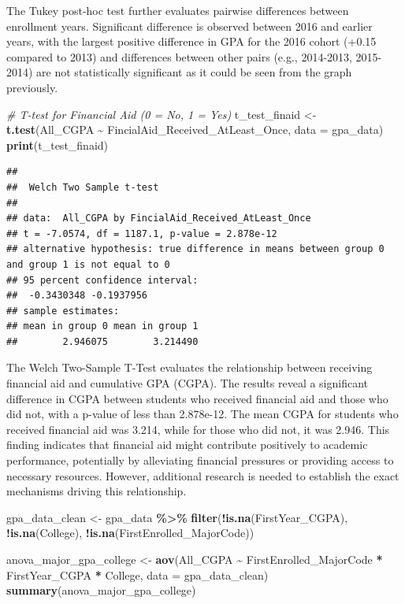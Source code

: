 \documentclass[
  12pt,
]{article}
\newenvironment{Shaded}{\begin{snugshade}}{\end{snugshade}}
\newcommand{\AttributeTok}[1]{\textcolor[rgb]{0.13,0.29,0.53}{#1}}
\newcommand{\CommentTok}[1]{\textcolor[rgb]{0.56,0.35,0.01}{\textit{#1}}}
\newcommand{\FunctionTok}[1]{\textcolor[rgb]{0.13,0.29,0.53}{\textbf{#1}}}
\newcommand{\NormalTok}[1]{#1}
\newcommand{\OtherTok}[1]{\textcolor[rgb]{0.56,0.35,0.01}{#1}}
\newcommand{\SpecialCharTok}[1]{\textcolor[rgb]{0.81,0.36,0.00}{\textbf{#1}}}
\begin{document}
The Tukey post-hoc test further evaluates pairwise differences between
enrollment years. Significant difference is observed between 2016 and
earlier years, with the largest positive difference in GPA for the 2016
cohort (+0.15 compared to 2013) and differences between other pairs
(e.g., 2014-2013, 2015-2014) are not statistically significant as it
could be seen from the graph previously.

\begin{Shaded}
\begin{Highlighting}[]
\CommentTok{\# T{-}test for Financial Aid (0 = No, 1 = Yes)}
\NormalTok{t\_test\_finaid }\OtherTok{\textless{}{-}} \FunctionTok{t.test}\NormalTok{(All\_CGPA }\SpecialCharTok{\textasciitilde{}}\NormalTok{ FincialAid\_Received\_AtLeast\_Once, }\AttributeTok{data =}\NormalTok{ gpa\_data)}
\FunctionTok{print}\NormalTok{(t\_test\_finaid)}
\end{Highlighting}
\end{Shaded}

\begin{verbatim}
## 
##  Welch Two Sample t-test
## 
## data:  All_CGPA by FincialAid_Received_AtLeast_Once
## t = -7.0574, df = 1187.1, p-value = 2.878e-12
## alternative hypothesis: true difference in means between group 0 and group 1 is not equal to 0
## 95 percent confidence interval:
##  -0.3430348 -0.1937956
## sample estimates:
## mean in group 0 mean in group 1 
##        2.946075        3.214490
\end{verbatim}

The Welch Two-Sample T-Test evaluates the relationship between receiving
financial aid and cumulative GPA (CGPA). The results reveal a
significant difference in CGPA between students who received financial
aid and those who did not, with a p-value of less than 2.878e-12. The
mean CGPA for students who received financial aid was 3.214, while for
those who did not, it was 2.946. This finding indicates that financial
aid might contribute positively to academic performance, potentially by
alleviating financial pressures or providing access to necessary
resources. However, additional research is needed to establish the exact
mechanisms driving this relationship.

\begin{Shaded}
\begin{Highlighting}[]
\NormalTok{gpa\_data\_clean }\OtherTok{\textless{}{-}}\NormalTok{ gpa\_data }\SpecialCharTok{\%\textgreater{}\%}
    \FunctionTok{filter}\NormalTok{(}\SpecialCharTok{!}\FunctionTok{is.na}\NormalTok{(FirstYear\_CGPA), }\SpecialCharTok{!}\FunctionTok{is.na}\NormalTok{(College), }\SpecialCharTok{!}\FunctionTok{is.na}\NormalTok{(FirstEnrolled\_MajorCode))}

\NormalTok{anova\_major\_gpa\_college }\OtherTok{\textless{}{-}} \FunctionTok{aov}\NormalTok{(All\_CGPA }\SpecialCharTok{\textasciitilde{}}\NormalTok{ FirstEnrolled\_MajorCode }\SpecialCharTok{*}\NormalTok{ FirstYear\_CGPA }\SpecialCharTok{*}
\NormalTok{    College, }\AttributeTok{data =}\NormalTok{ gpa\_data\_clean)}
\FunctionTok{summary}\NormalTok{(anova\_major\_gpa\_college)}
\end{Highlighting}
\end{Shaded}
\end{document}
